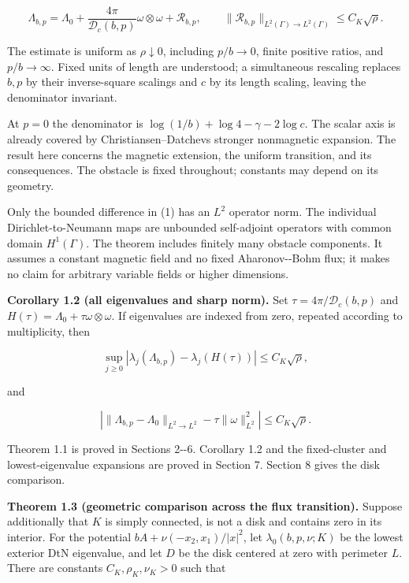 \documentclass[11pt]{article}
\begin{document}
\[\Lambda_{b,p}=\Lambda_0+\frac{4\pi}{\mathcal D_c(b,p)}\omega\otimes\omega+\mathcal R_{b,p},\qquad
\|\mathcal R_{b,p}\|_{L^2(\Gamma)\to L^2(\Gamma)}\leq C_K\sqrt\rho.\tag{1}\]

The estimate is uniform as \(\rho\downarrow0\), including \(p/b\to0\),
finite positive ratios, and \(p/b\to\infty\). Fixed units of length are
understood; a simultaneous rescaling replaces \(b,p\) by their
inverse-square scalings and \(c\) by its length scaling, leaving the
denominator invariant.

At \(p=0\) the denominator is \(\log(1/b)+\log4-\gamma-2\log c\). The
scalar axis is already covered by
Christiansen--Datchev\textquotesingle s stronger nonmagnetic expansion.
The result here concerns the magnetic extension, the uniform transition,
and its consequences. The obstacle is fixed throughout; constants may
depend on its geometry.

Only the bounded difference in (1) has an \(L^2\) operator norm. The
individual Dirichlet-to-Neumann maps are unbounded self-adjoint
operators with common domain \(H^1(\Gamma)\). The theorem includes
finitely many obstacle components. It assumes a constant magnetic field
and no fixed Aharonov-\/-Bohm flux; it makes no claim for arbitrary
variable fields or higher dimensions.

\textbf{Corollary 1.2 (all eigenvalues and sharp norm).} Set
\(\tau=4\pi/\mathcal D_c(b,p)\) and
\(H(\tau)=\Lambda_0+\tau\omega\otimes\omega\). If eigenvalues are
indexed from zero, repeated according to multiplicity, then

\[\sup_{j\geq0}|\lambda_j(\Lambda_{b,p})-\lambda_j(H(\tau))|\leq C_K\sqrt\rho,\]

and

\[\left|\|\Lambda_{b,p}-\Lambda_0\|_{L^2\to L^2}-\tau\|\omega\|_{L^2}^2\right|\leq C_K\sqrt\rho.\]

Theorem 1.1 is proved in Sections 2-\/-6. Corollary 1.2 and the
fixed-cluster and lowest-eigenvalue expansions are proved in Section 7.
Section 8 gives the disk comparison.

\textbf{Theorem 1.3 (geometric comparison across the flux transition).}
Suppose additionally that \(K\) is simply connected, is not a disk and
contains zero in its interior. For the potential
\(bA+\nu(-x_2,x_1)/|x|^2\), let \(\lambda_0(b,p,\nu;K)\) be the lowest
exterior DtN eigenvalue, and let \(D\) be the disk centered at zero with
perimeter \(L\). There are constants \(C_K,\rho_K,\nu_K>0\) such that
\end{document}
